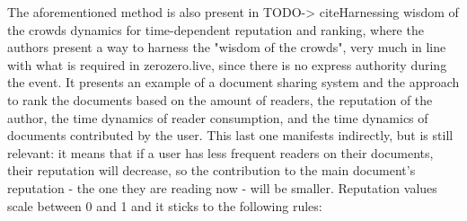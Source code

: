 The aforementioned method is also present in TODO-> cite{Harnessing wisdom of the crowds dynamics for time-dependent reputation and ranking}, where the authors present a way to harness the "wisdom of the crowds", very much in line with what is required in zerozero.live, since there is no express authority during the event. It presents an example of a document sharing system and the approach to rank the documents based on the amount of readers, the reputation of the author, the time dynamics of reader consumption, and the time dynamics of documents contributed by the user. This last one manifests indirectly, but is still relevant: it means that if a user has less frequent readers on their documents, their reputation will decrease, so the contribution to the main document's reputation - the one they are reading now - will be smaller.
Reputation values scale between 0 and 1 and it sticks to the following rules:
